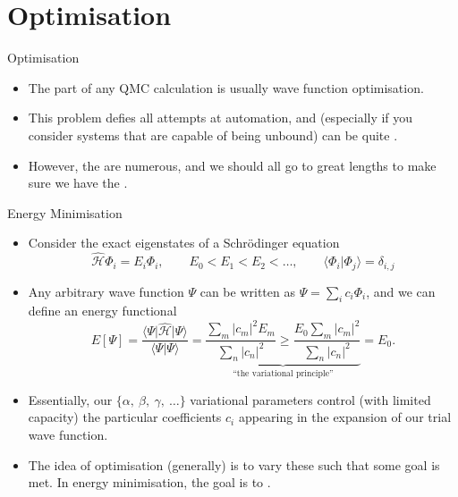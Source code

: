 \documentclass[12pt, pdf, hyperref={draft}, usenames, dvipsnames,
aspectratio=169]{beamer}
\newcommand{\red}[1]{{\bf\color{LancsRed}{#1}}}
\newcommand{\blue}[1]{{\bf\color{NavyBlue}{#1}}}
\newcommand{\green}[1]{{\bf\color{ForestGreen}{#1}}}
\begin{document}
\section{Optimisation}\label{sec:optimisation}

\begin{frame}{Optimisation}
\begin{itemize}
  \item The \red{hardest} part of any QMC calculation is usually wave function
  optimisation.
  \item This problem defies all attempts at automation, and (especially if you
  consider systems that are capable of being unbound) can be quite
  \red{annoying}.
  \item However, the \green{rewards} are numerous, and we should all go to
  great lengths to make sure we have the \blue{best wave function we can possibly
  have}.
\end{itemize}
\end{frame}


\begin{frame}{Energy Minimisation}
\begin{itemize}
  \item Consider the exact eigenstates of a Schr\"{o}dinger equation
  \begin{equation}
    \mathcal{\hat H}\Phi_i = E_i \Phi_i, \qquad E_0 < E_1 < E_2 < \ldots,
    \qquad \langle \Phi_i \vert \Phi_j \rangle = \delta_{i,j}
  \end{equation}
  \item Any arbitrary wave function $\Psi$ can be written as $\Psi = \sum_i c_i
  \Phi_i$, and we can define an energy functional
  \begin{equation}
    E\left[ \Psi \right] = \dfrac{\langle \Psi \lvert \mathcal{\hat H} \rvert
    \Psi \rangle}{\langle \Psi \vert \Psi \rangle} = \underbrace{\dfrac{\sum_m \lvert c_m
    \rvert^2 E_m}{\sum_n \lvert c_n \rvert^2} \geq \dfrac{E_0\sum_m \lvert c_m
    \rvert^2}{\sum_n \lvert c_n \rvert^2}}_{\text{``the variational principle''}} = E_0.
  \end{equation}
  \item Essentially, our $\{ \alpha,\ \beta,\ \gamma,\ \ldots \}$ variational
  parameters control (with limited capacity) the particular coefficients $c_i$
  appearing in the expansion of our trial wave function.
  \item The idea of optimisation (generally) is to vary these such that some
  goal is met. In energy minimisation, the goal is to \blue{minimise the
  energy}.
\end{itemize}
\end{frame}
\end{document}
